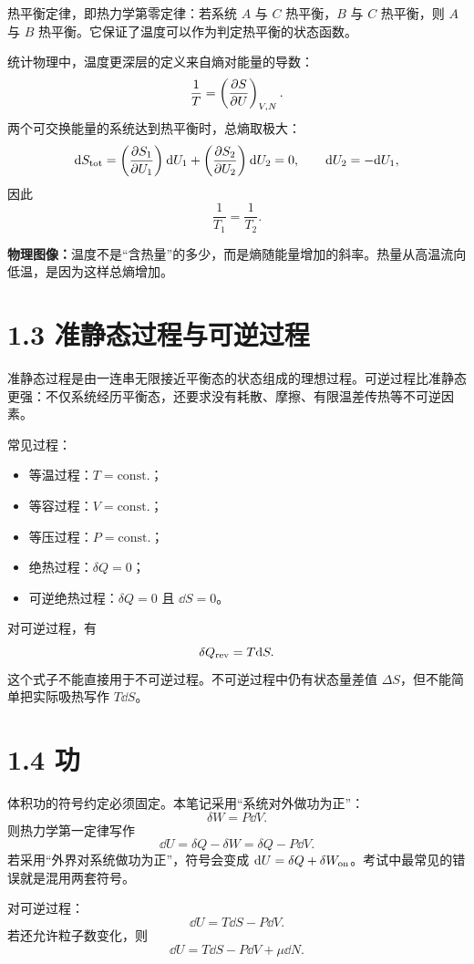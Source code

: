 热平衡定律，即热力学第零定律：若系统 $A$ 与 $C$ 热平衡，$B$ 与 $C$ 热平衡，则 $A$ 与 $B$ 热平衡。它保证了温度可以作为判定热平衡的状态函数。

统计物理中，温度更深层的定义来自熵对能量的导数：
\[
  \frac{1}{T} = \left(\frac{\partial S}{\partial U}\right)_{V,N}.
\]
两个可交换能量的系统达到热平衡时，总熵取极大：
\[
  \mathrm{d} S_{\rm tot}
  = \left(\frac{\partial S_1}{\partial U_1}\right)_{}\mathrm{d} U_1
  + \left(\frac{\partial S_2}{\partial U_2}\right)_{}\mathrm{d} U_2 = 0,\qquad \mathrm{d} U_2=-\mathrm{d} U_1 ,
\]
因此
\[
  \frac{1}{T_1}=\frac{1}{T_2}.
\]

\begin{keybox}
\textbf{物理图像：}温度不是“含热量”的多少，而是熵随能量增加的斜率。热量从高温流向低温，是因为这样总熵增加。
\end{keybox}

\section{1.3 准静态过程与可逆过程}

准静态过程是由一连串无限接近平衡态的状态组成的理想过程。可逆过程比准静态更强：不仅系统经历平衡态，还要求没有耗散、摩擦、有限温差传热等不可逆因素。

常见过程：
\begin{itemize}
  \item 等温过程：$T=\mathrm{const.}$；
  \item 等容过程：$V=\mathrm{const.}$；
  \item 等压过程：$P=\mathrm{const.}$；
  \item 绝热过程：$\delta Q=0$；
  \item 可逆绝热过程：$\delta Q=0$ 且 $\dd S=0$。
\end{itemize}

对可逆过程，有
\[
  \delta Q_{\rm rev}=T\mathrm{d} S .
\]
这个式子不能直接用于不可逆过程。不可逆过程中仍有状态量差值 $\Delta S$，但不能简单把实际吸热写作 $T\dd S$。

\section{1.4 功}

体积功的符号约定必须固定。本笔记采用“系统对外做功为正”：
\[
  \delta W = P\dd V .
\]
则热力学第一定律写作
\[
  \dd U = \delta Q - \delta W = \delta Q - P\dd V .
\]
若采用“外界对系统做功为正”，符号会变成 $\mathrm{d} U=\delta Q+\delta W_{\rm on}$。考试中最常见的错误就是混用两套符号。

对可逆过程：
\[
  \dd U = T\dd S - P\dd V .
\]
若还允许粒子数变化，则
\[
  \dd U = T\dd S - P\dd V + \mu\dd N .
\]


